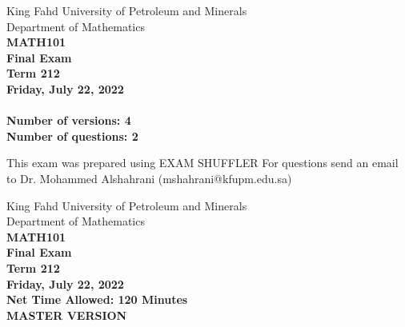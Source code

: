 \documentclass[amsfonts,bezier,leqno,fleqn,12pt,a4paper]{article}
\begin{document}
\thispagestyle{empty}
\begin{center}
    \begin{large}
        King Fahd University of Petroleum and Minerals\\ 
        Department of Mathematics \\ 
        \vspace*{2cm}
        {\bf MATH101 }  \\
        {\bf Final Exam }  \\
        {\bf Term 212 }  \\
        {\bf Friday, July 22, 2022 }  \\ 

        \vspace*{3cm}
        {\bf{\Huge{}}}\\
        \vspace*{2cm}
        {\bf Number of versions: 4 }  \\
        {\bf Number of questions: 2 }  \\
        \vspace*{0.2cm}
    \end{large}

    \vfill

    \tiny{This exam was prepared using EXAM SHUFFLER}
    \tiny{For questions send an email to Dr. Mohammed Alshahrani (mshahrani@kfupm.edu.sa) }
\end{center}

\newpage



\thispagestyle{empty}
\begin{center}
    \begin{large}
        King Fahd University of Petroleum and Minerals \\
        Department of Mathematics  \\
        {\bf MATH101 } \\ 
        {\bf Final Exam  } \\
        {\bf  Term 212 }  \\
        {\bf Friday, July 22, 2022 }  \\ 
        {\bf Net Time Allowed: 120 Minutes }  \\
        \vspace*{6cm}
        {\bf {\Huge{MASTER VERSION}}}  \\
    \end{large}
\end{center}
\end{document}
